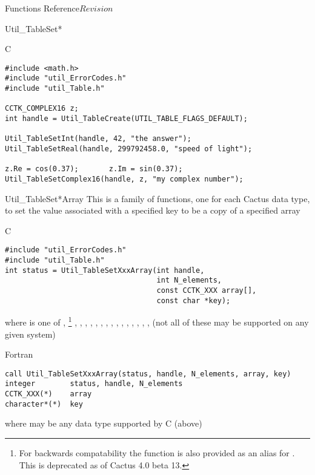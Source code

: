\begin{cactuspart}{ Functions Reference}{}{$Revision$}
\begin{FunctionDescription}{Util\_TableSet*}
\begin{ExampleSection}
\begin{Example}{C}
\begin{verbatim}
#include <math.h>
#include "util_ErrorCodes.h"
#include "util_Table.h"

CCTK_COMPLEX16 z;
int handle = Util_TableCreate(UTIL_TABLE_FLAGS_DEFAULT);

Util_TableSetInt(handle, 42, "the answer");
Util_TableSetReal(handle, 299792458.0, "speed of light");

z.Re = cos(0.37);       z.Im = sin(0.37);
Util_TableSetComplex16(handle, z, "my complex number");
\end{verbatim}
\end{Example}
\end{ExampleSection}
\end{FunctionDescription}


\begin{FunctionDescription}{Util\_TableSet*Array}
\label{Util-TableSet*Array}
This is a family of functions, one for each Cactus data type,
to set the value associated with a specified key to be a copy
of a specified array

\begin{SynopsisSection}
\begin{Synopsis}{C}
\begin{verbatim}
#include "util_ErrorCodes.h"
#include "util_Table.h"
int status = Util_TableSetXxxArray(int handle,
                                   int N_elements,
                                   const CCTK_XXX array[],
                                   const char *key);
\end{verbatim}
where  is one of
   , %
\footnote{%
	 For backwards compatability the function
	  is also provided
	 as an alias for .
	 This is deprecated as of Cactus 4.0 beta 13.
	 }%
,
   , ,
   , , , , ,
   , , , ,
   , , , 
(not all of these may be supported on any given system)
\end{Synopsis}
\begin{Synopsis}{Fortran}
\begin{verbatim}
call Util_TableSetXxxArray(status, handle, N_elements, array, key)
integer        status, handle, N_elements
CCTK_XXX(*)    array
character*(*)  key
\end{verbatim}
where  may be any data type supported by C (above)
\end{Synopsis}
\end{SynopsisSection}


\end{FunctionDescription}
\end{cactuspart}

